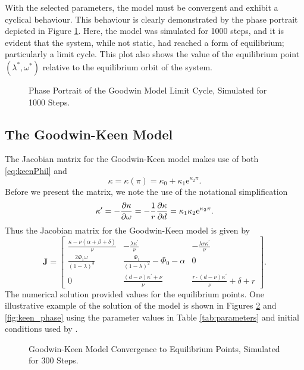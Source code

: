 \documentclass[12pt, centerh1]{article}
\begin{document}
\noindent With the selected parameters, the model must be convergent and exhibit a cyclical behaviour. This behaviour is clearly demonstrated by the phase portrait depicted in Figure \ref{fig:goodwin_phase}. Here, the model was simulated for 1000 steps, and it is evident that the system, while not static, had reached a form of equilibrium; particularly a limit cycle. This plot also shows the value of the equilibrium point $(\lambda^\ast, \omega^\ast)$ relative to the equilibrium orbit of the system.
\begin{figure}[H]
    \centering
    
    \caption{Phase Portrait of the Goodwin Model Limit Cycle, Simulated for 1000 Steps.}
    \label{fig:goodwin_phase}
\end{figure}

\subsection{The Goodwin-Keen Model}
The Jacobian matrix for the Goodwin-Keen model makes use of both \eqref{eq:keenPhil} and 
\begin{equation*} \label{eq:keenKappa}
    \kappa=\kappa(\pi) = \kappa_0 + \kappa_1\mathrm e^{\kappa_2\pi}.
\end{equation*}
Before we present the matrix, we note the use of the notational simplification
\begin{equation*}
    \kappa^\prime = -\pdv{\kappa}{\omega} = -\frac{1}{r}\pdv{\kappa}{d} = \kappa_1\kappa_2\mathrm e^{\kappa_2\pi}.
\end{equation*}
Thus the Jacobian matrix for the Goodwin-Keen model is given by
\begin{equation} \label{eq:jac_keen}
    \mathbf J = %
    \begin{bmatrix}
        \frac{\kappa-\nu(\alpha+\beta+\delta)}{\nu} & -\frac{\lambda\kappa^\prime}{\nu} & -\frac{\lambda r\kappa^\prime}{\nu} \\[0.5em]
        \frac{2\Phi_1\omega}{(1-\lambda)^3} & \frac{\Phi_1}{(1-\lambda)^2}-\Phi_0-\alpha & 0\\[0.5em]
        0 & \frac{(d-\nu)\kappa^\prime+\nu}{\nu} & \frac{r\cdot(d-\nu)\kappa^\prime}{\nu}+ \delta + r
    \end{bmatrix}.
\end{equation}
The numerical solution provided values for the equilibrium points. One illustrative example of the solution of the model is shown in Figures \ref{fig:keen} and \ref{fig:keen_phase} using the parameter values in Table \ref{tab:parameters} and initial conditions used by \citet{grasselli2012analysis}.
\begin{figure}[H]
    \centering
    
    \caption{Goodwin-Keen Model Convergence to Equilibrium Points, Simulated for 300 Steps.}
    \label{fig:keen}
\end{figure}
\end{document}

